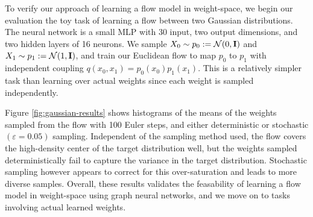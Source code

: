 To verify our approach of learning a flow model in weight-space, we begin our evaluation the toy task of learning a flow between two Gaussian distributions. The neural network is a small MLP with 30 input, two output dimensions, and two hidden layers of 16 neurons. We sample $X_0 \sim p_0 := \mathcal{N}(0, \mathbf{I})$ and $X_1 \sim p_1 := \mathcal{N}(1, \mathbf{I})$, and train our Euclidean flow to map $p_0$ to $p_1$ with independent coupling $q(x_0, x_1) = p_0(x_0)p_1(x_1)$. This is a relatively simpler task than learning over actual weights since each weight is sampled independently. 

Figure \ref{fig:gaussian-results} shows histograms of the means of the weights sampled from the flow with 100 Euler steps, and either deterministic or stochastic $(\varepsilon=0.05)$ sampling. Independent of the sampling method used, the flow covers the high-density center of the target distribution well, but the weights sampled deterministically fail to capture the variance in the target distribution. Stochastic sampling however appears to correct for this over-saturation and leads to more diverse samples. Overall, these results validates the feasability of learning a flow model in weight-space using graph neural networks, and we move on to tasks involving actual learned weights. 

